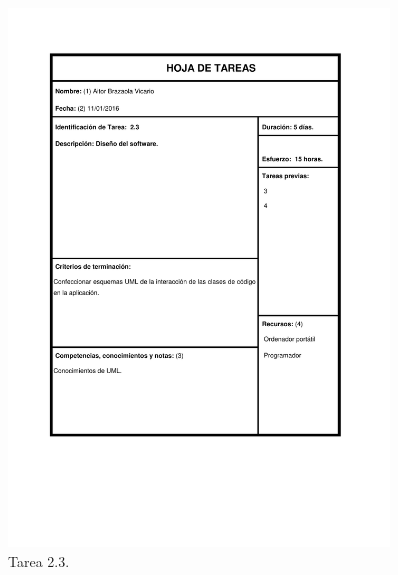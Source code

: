 \documentclass{DeustoFDP}
\begin{document}
\begin{figure}[H]
    \centering
    \includegraphics[width=0.9\textwidth]{fig/Tareas/23}
    \caption{Tarea 2.3.}
    \label{fig:t23}
\end{figure}
\end{document}
